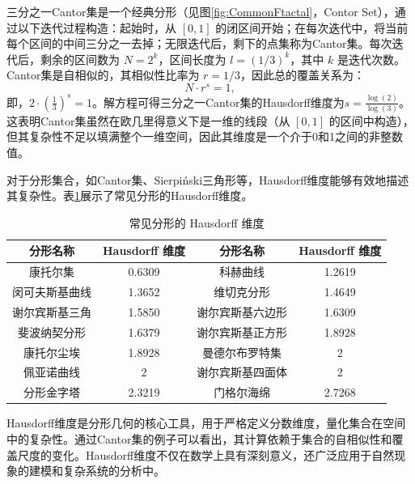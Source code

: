 三分之一Cantor集是一个经典分形（见图\ref{fig:CommonFtactal}，Contor Set），通过以下迭代过程构造：起始时，从 $[0, 1]$ 的闭区间开始；在每次迭代中，将当前每个区间的中间三分之一去掉；无限迭代后，剩下的点集称为Cantor集。每次迭代后，剩余的区间数为 $N = 2^k$，区间长度为 $l = (1/3)^k$，其中 $k$ 是迭代次数。Cantor集是自相似的，其相似性比率为 $r = 1/3$，因此总的覆盖关系为：
\begin{equation}
    N \cdot r^s = 1,
\end{equation}
即，$2 \cdot \left(\frac{1}{3}\right)^s = 1$。解方程可得三分之一Cantor集的Hausdorff维度为$s = \frac{\log(2)}{\log(3)}$。这表明Cantor集虽然在欧几里得意义下是一维的线段（从 $[0,1]$ 的区间中构造），但其复杂性不足以填满整个一维空间，因此其维度是一个介于0和1之间的非整数值。
 
对于分形集合，如Cantor集、Sierpiński三角形等，Hausdorff维度能够有效地描述其复杂性。表\ref{tab:FracDim}展示了常见分形的Hausdorff维度。

\begin{table}[h!]
\centering
\begin{tabular}{|c|c|c|c|}
\toprule
\textbf{分形名称} & \textbf{Hausdorff 维度} & \textbf{分形名称} & \textbf{Hausdorff 维度}\\
\midrule
康托尔集 & 0.6309 & 科赫曲线 & 1.2619\\
闵可夫斯基曲线 & 1.3652 & 维切克分形 & 1.4649\\
谢尔宾斯基三角 & 1.5850 & 谢尔宾斯基六边形 & 1.6309\\
斐波纳契分形 & 1.6379 & 谢尔宾斯基正方形 & 1.8928\\
康托尔尘埃 & 1.8928 & 曼德尔布罗特集 & 2\\
佩亚诺曲线 & 2 & 谢尔宾斯基四面体 & 2\\
分形金字塔 & 2.3219 & 门格尔海绵 & 2.7268\\
\bottomrule
\end{tabular}
\caption{常见分形的 Hausdorff 维度}
\label{tab:FracDim}
\end{table}

Hausdorff维度是分形几何的核心工具，用于严格定义分数维度，量化集合在空间中的复杂性。通过Cantor集的例子可以看出，其计算依赖于集合的自相似性和覆盖尺度的变化。Hausdorff维度不仅在数学上具有深刻意义，还广泛应用于自然现象的建模和复杂系统的分析中。

